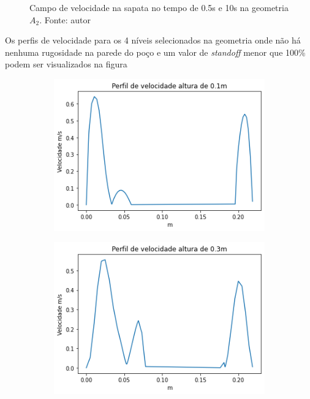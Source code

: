 \begin{figure}[H]
\begin{subfigure}[b]{0.42\linewidth}
    	\end{subfigure}
    	\caption{Campo de velocidade na sapata no tempo de 0.5s e 10s na geometria $A_2$. Fonte: autor}
    	\label{fig:perfil_velocidade_liso_sapata_standoff_paraview_0_5s}
\end{figure}
    
Os perfis de velocidade para os 4 níveis selecionados na geometria onde não há nenhuma rugosidade na parede do poço e um valor de \textit{standoff} menor que 100\% podem ser visualizados na figura 
\begin{figure}[H]
    	\begin{subfigure}[b]{0.42\linewidth}
    		\includegraphics[width=\linewidth]{img/perfil_vel/liso/perfil_velocidade_liso_s_100.png}
    	\end{subfigure}
    	\begin{subfigure}[b]{0.42\linewidth}
    		\includegraphics[width=\linewidth]{img/perfil_vel/liso/perfil_velocidade_liso_s_300.png}

\end{subfigure}
\end{figure}
